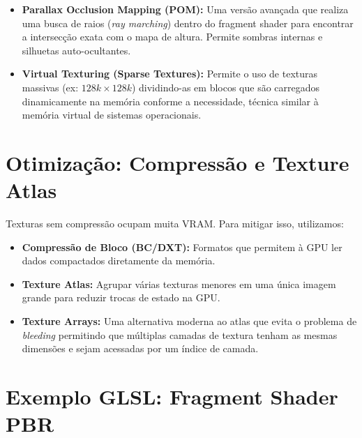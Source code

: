 \begin{itemize}
    \item \textbf{Parallax Occlusion Mapping (POM):} Uma versão avançada que realiza uma busca de raios (\textit{ray marching}) dentro do fragment shader para encontrar a intersecção exata com o mapa de altura. 
    Permite sombras internas e silhuetas auto-ocultantes.
    \item \textbf{Virtual Texturing (Sparse Textures):} Permite o uso de texturas massivas (ex: $128k \times 128k$) dividindo-as em blocos que são carregados dinamicamente na memória conforme a necessidade, técnica similar à memória virtual de sistemas operacionais.
\end{itemize}

\section{Otimização: Compressão e Texture Atlas}

Texturas sem compressão ocupam muita VRAM. Para mitigar isso, utilizamos:
\begin{itemize}
    \item \textbf{Compressão de Bloco (BC/DXT):} Formatos que permitem à GPU ler dados compactados diretamente da memória.
    \item \textbf{Texture Atlas:} Agrupar várias texturas menores em uma única imagem grande para reduzir trocas de estado na GPU.
    \item \textbf{Texture Arrays:} Uma alternativa moderna ao atlas que evita o problema de \textit{bleeding} permitindo que múltiplas camadas de textura tenham as mesmas dimensões e sejam acessadas por um índice de camada.
\end{itemize}

\section{Exemplo GLSL: Fragment Shader PBR}

